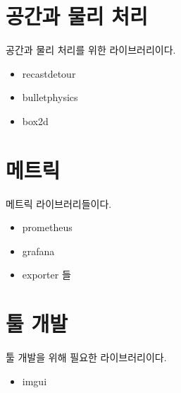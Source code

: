 \section{공간과 물리 처리}

공간과 물리 처리를 위한 라이브러리이다. 

\begin{itemize}
    \item recastdetour 
    \item bulletphysics
    \item box2d
\end{itemize}


\section{메트릭}

메트릭 라이브러리들이다. 

\begin{itemize}
    \item prometheus 
    \item grafana 
    \item exporter 들
\end{itemize}

\section{툴 개발}

툴 개발을 위해 필요한 라이브러리이다. 

\begin{itemize}
    \item imgui
\end{itemize}